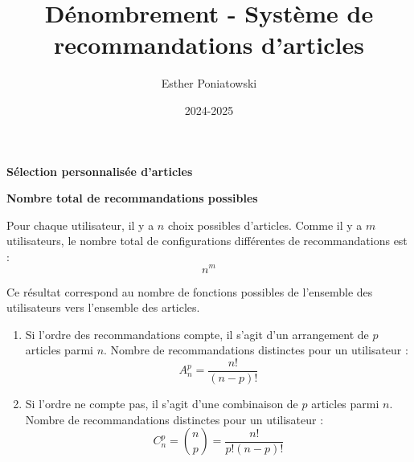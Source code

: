 \documentclass[10pt,a4paper]{article}
\title{Dénombrement - Système de recommandations d'articles}
\author{Esther Poniatowski}
\date{2024-2025}
\begin{document}

\q \textbf{Sélection personnalisée d'articles}

    \textbf{Nombre total de recommandations possibles}

    Pour chaque utilisateur, il y a $n$ choix possibles d'articles. Comme il y a $m$ utilisateurs, le
    nombre total de configurations différentes de recommandations est :
    $$ n^m $$

    Ce résultat correspond au nombre de fonctions possibles de l'ensemble des utilisateurs vers
    l'ensemble des articles.

   \begin{enumerate}

      \item  Si l'ordre des recommandations compte, il s'agit d'un arrangement de $p$ articles parmi
      $n$. Nombre de recommandations distinctes pour un utilisateur :
      $$ A_n^p = \frac{n!}{(n-p)!} $$

      \item Si l'ordre ne compte pas, il s'agit d'une combinaison de $p$ articles parmi $n$.
      Nombre de recommandations distinctes pour un utilisateur :
      $$ C_n^p = \binom{n}{p} = \frac{n!}{p!(n-p)!} $$
    \end{enumerate}
\end{document}
